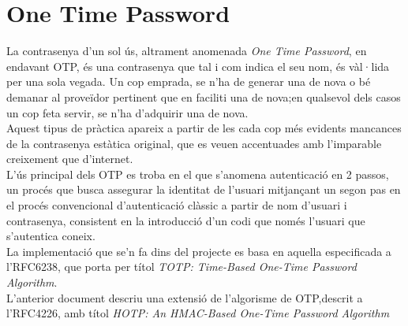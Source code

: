 \section{One Time Password}
La contrasenya d’un sol ús, altrament anomenada \textit{One Time Password}, en endavant OTP, és una contrasenya que tal i com indica el seu nom, és vàl·lida per una sola vegada. Un cop emprada, se n’ha de generar una de nova o bé demanar al proveïdor pertinent que en faciliti una de nova;en qualsevol dels casos un cop feta servir, se n’ha d’adquirir una de nova.\\
\newline Aquest tipus de pràctica apareix a partir de les cada cop més evidents mancances de la contrasenya estàtica original, que es veuen accentuades amb l’imparable creixement que d’internet.\\
\newline L’ús principal dels OTP es troba en el que s’anomena autenticació en 2 passos, un procés que busca assegurar la identitat de l’usuari mitjançant un segon pas en el procés convencional d’autenticació clàssic a partir de nom d’usuari i contrasenya, consistent en la introducció d’un codi que només l’usuari que s’autentica coneix.\\
\newline La implementació que se'n fa dins del projecte es basa en aquella especificada a l'RFC6238, que porta per títol \textit{TOTP: Time-Based One-Time Password Algorithm}.\\
\newline L'anterior document descriu una extensió de l'algorisme de OTP,descrit a l'RFC4226, amb títol \textit{HOTP: An HMAC-Based One-Time Password Algorithm}
